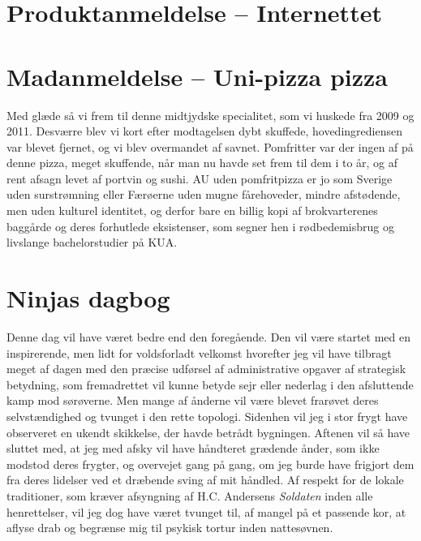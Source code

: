 \begin{minipage}[t]{100mm}
\vspace{1mm}
\section*{Produktanmeldelse -- Internettet}


\vspace{1mm}
\section*{Madanmeldelse -- Uni-pizza pizza}

\vspace{2mm}

Med glæde så vi frem til denne midtjydske specialitet, som vi huskede fra 2009 og 2011. Desværre blev vi kort efter modtagelsen dybt skuffede, hovedingrediensen var blevet fjernet, og vi blev overmandet af savnet. Pomfritter var der ingen af på denne pizza, meget skuffende, når man nu havde set frem til dem i to år, og af rent afsagn levet af portvin og sushi. AU uden pomfritpizza er jo som Sverige uden surstrømning eller Færøerne uden mugne fårehoveder, mindre afstødende, men uden kulturel identitet, og derfor bare en billig kopi af brokvarterenes baggårde  og deres forhutlede eksistenser, som segner hen i rødbedemisbrug og livslange bachelorstudier på KUA. 

\section*{Ninjas dagbog}
Denne dag vil have været bedre end den foregående. Den vil være startet med en inspirerende, men lidt for voldsforladt velkomst hvorefter jeg vil have tilbragt meget af dagen med den præcise udførsel af administrative opgaver af strategisk betydning, som fremadrettet vil kunne betyde sejr eller nederlag i den afsluttende kamp mod sørøverne. Men mange af ånderne vil være blevet frarøvet deres selvstændighed og tvunget i den rette topologi. Sidenhen vil jeg i stor frygt have observeret en ukendt skikkelse, der havde betrådt bygningen. Aftenen vil så have sluttet med, at jeg med afsky vil have håndteret grædende ånder, som ikke modstod deres frygter, og overvejet gang på gang, om jeg burde have frigjort dem fra deres lidelser ved et dræbende sving af mit håndled. Af respekt for de lokale traditioner, som kræver afsyngning af H.C. Andersens \emph{Soldaten} inden alle henrettelser, vil jeg dog have været tvunget til, af mangel på et passende kor, at aflyse drab og begrænse mig til psykisk tortur inden nattesøvnen.


\end{minipage}
